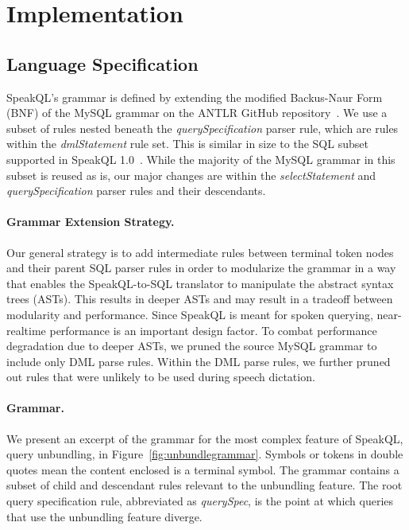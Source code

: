\section{Implementation}


\subsection{Language Specification}

SpeakQL's grammar is defined by extending the modified Backus-Naur Form (BNF) of the MySQL grammar on the ANTLR GitHub repository~\cite{antlrgrammarsv4,Parr2014}. 
We use a subset of rules nested beneath the \emph{querySpecification} parser rule, which are rules within the \emph{dmlStatement} rule set. 
This is similar in size to the SQL subset supported in SpeakQL 1.0~\cite{Shah2020}. 
While the majority of the MySQL grammar in this subset is reused as is, our major changes are within the \emph{selectStatement} and \emph{querySpecification} parser rules and their descendants.

\paragraph{\textbf{Grammar Extension Strategy.}} 
Our general strategy is to add intermediate rules between terminal token nodes and their parent SQL parser rules in order to modularize the grammar in a way that enables the SpeakQL-to-SQL translator to manipulate the abstract syntax trees (ASTs). 
This results in deeper ASTs and may result in a tradeoff between modularity and performance. 
Since SpeakQL is meant for spoken querying, near-realtime performance is an important design factor. 
To combat performance degradation due to deeper ASTs, we pruned the source MySQL grammar to include only DML parse rules. 
Within the DML parse rules, we further pruned out rules that were unlikely to be used during speech dictation.

\paragraph{\textbf{Grammar.}}
We present an excerpt of the grammar for the most complex feature of SpeakQL, query unbundling, in Figure~\ref{fig:unbundlegrammar}.
Symbols or tokens in double quotes mean the content enclosed is a terminal symbol. 
The grammar contains a subset of child and descendant rules relevant to the unbundling feature. 
The root query specification rule, abbreviated as \emph{querySpec}, is the point at which queries that use the unbundling feature diverge.

